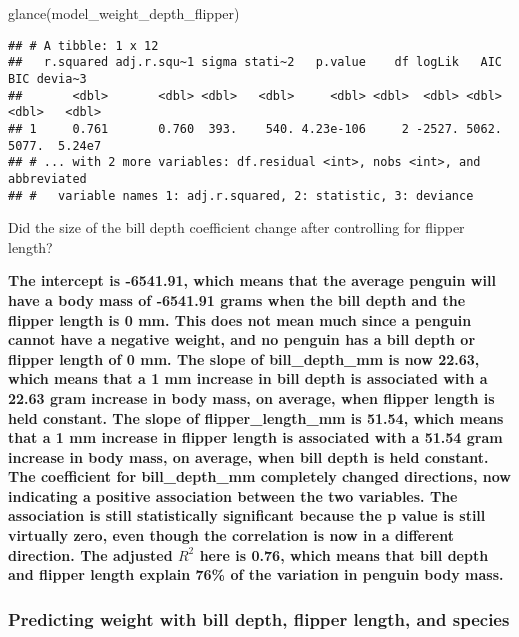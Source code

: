 \documentclass[
]{article}
\newenvironment{Shaded}{\begin{snugshade}}{\end{snugshade}}
\newcommand{\FunctionTok}[1]{\textcolor[rgb]{0.00,0.00,0.00}{#1}}
\newcommand{\NormalTok}[1]{#1}
\begin{document}
\begin{Shaded}
\begin{Highlighting}[]
\FunctionTok{glance}\NormalTok{(model\_weight\_depth\_flipper)}
\end{Highlighting}
\end{Shaded}

\begin{verbatim}
## # A tibble: 1 x 12
##   r.squared adj.r.squ~1 sigma stati~2   p.value    df logLik   AIC   BIC devia~3
##       <dbl>       <dbl> <dbl>   <dbl>     <dbl> <dbl>  <dbl> <dbl> <dbl>   <dbl>
## 1     0.761       0.760  393.    540. 4.23e-106     2 -2527. 5062. 5077.  5.24e7
## # ... with 2 more variables: df.residual <int>, nobs <int>, and abbreviated
## #   variable names 1: adj.r.squared, 2: statistic, 3: deviance
\end{verbatim}

Did the size of the bill depth coefficient change after controlling for
flipper length?

\textbf{The intercept is -6541.91, which means that the average penguin
will have a body mass of -6541.91 grams when the bill depth and the
flipper length is 0 mm. This does not mean much since a penguin cannot
have a negative weight, and no penguin has a bill depth or flipper
length of 0 mm. The slope of bill\_depth\_mm is now 22.63, which means
that a 1 mm increase in bill depth is associated with a 22.63 gram
increase in body mass, on average, when flipper length is held constant.
The slope of flipper\_length\_mm is 51.54, which means that a 1 mm
increase in flipper length is associated with a 51.54 gram increase in
body mass, on average, when bill depth is held constant. The coefficient
for bill\_depth\_mm completely changed directions, now indicating a
positive association between the two variables. The association is still
statistically significant because the p value is still virtually zero,
even though the correlation is now in a different direction. The
adjusted \(R^2\) here is 0.76, which means that bill depth and flipper
length explain 76\% of the variation in penguin body mass.}

\hypertarget{predicting-weight-with-bill-depth-flipper-length-and-species}{%
\subsubsection{Predicting weight with bill depth, flipper length, and
species}\label{predicting-weight-with-bill-depth-flipper-length-and-species}}
\end{document}
